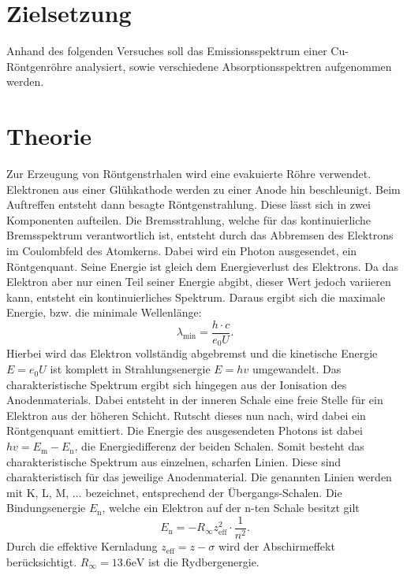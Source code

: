 \section{Zielsetzung}

Anhand des folgenden Versuches soll das Emissionsspektrum einer Cu-Röntgenröhre analysiert, sowie verschiedene Absorptionsspektren aufgenommen werden.

\section{Theorie}
\label{sec:Theorie}

Zur Erzeugung von Röntgenstrhalen wird eine evakuierte Röhre verwendet. Elektronen aus einer Glühkathode werden zu einer Anode hin beschleunigt. Beim Auftreffen entsteht dann besagte Röntgenstrahlung. Diese lässt sich in zwei Komponenten aufteilen. Die Bremsstrahlung, welche für das kontinuierliche Bremsspektrum verantwortlich ist, entsteht durch das Abbremsen des Elektrons im Coulombfeld des Atomkerns. Dabei wird ein Photon ausgesendet, ein Röntgenquant. Seine Energie ist gleich dem Energieverlust des Elektrons. Da das Elektron aber nur einen Teil seiner Energie abgibt, dieser Wert jedoch variieren kann, entsteht ein kontinuierliches Spektrum. Daraus ergibt sich die maximale Energie, bzw. die minimale Wellenlänge:
\begin{equation}
\label{eq:1}
	\lambda_\text{min} = \frac{h \cdot c}{e_0 U}  .
\end{equation}
Hierbei wird das Elektron vollständig abgebremst und die kinetische Energie $E = e_0U$ ist komplett in Strahlungsenergie $E = hv$ umgewandelt. \*
Das charakteristische Spektrum ergibt sich hingegen aus der Ionisation des Anodenmaterials. Dabei entsteht in der inneren Schale eine freie Stelle für ein Elektron aus der höheren Schicht. Rutscht dieses nun nach, wird dabei ein Röntgenquant emittiert. Die Energie des ausgesendeten Photons ist dabei $hv = E_\text{m} - E_\text{n}$, die Energiedifferenz der beiden Schalen. Somit besteht das charakteristische Spektrum aus einzelnen, scharfen Linien. Diese sind charakteristisch für das jeweilige Anodenmaterial. Die genannten Linien werden mit K, L, M, ... bezeichnet, entsprechend der Übergangs-Schalen.
Die Bindungsenergie $E_\text{n}$, welche ein Elektron auf der n-ten Schale besitzt gilt
\begin{equation}
\label{eq:2}
	E_\text{n} = -R_\infty z_\text{eff}^2 \cdot \frac{1}{n^2}  .
\end{equation}
Durch die effektive Kernladung $z_\text{eff} = z - \sigma$ wird der Abschirmeffekt berücksichtigt. $R_\infty = 13.6 \text{eV}$ ist die Rydbergenergie.
